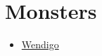 \documentclass{report}
\begin{document}
	\section{Monsters}

	\begin{itemize}
		\item \href{https://en.wikipedia.org/wiki/Wendigo}{Wendigo}
	\end{itemize}







\end{document}
